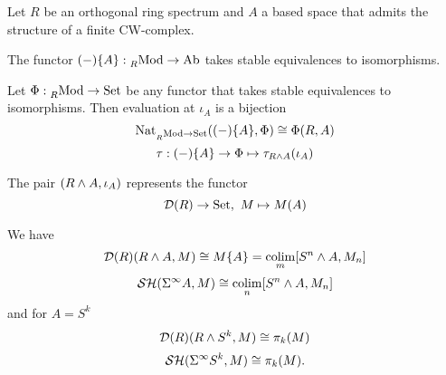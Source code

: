 \begin{theorem}
Let $R$ be an orthogonal ring spectrum and $A$ a based space that admits the structure of a finite CW-complex.
\begin{rmnumerate}
    \item The functor $(-)\{A\}:\prescript{}{R}{\operatorname{Mod}}\to{\normalfont\textup{Ab}}$ takes stable equivalences to isomorphisms.
    \item Let $\Phi:\prescript{}{R}{\operatorname{Mod}}\to{\normalfont\textup{Set}}$ be any functor that takes stable equivalences to isomorphisms. Then evaluation at $\iota_A$ is a bijection
    \[\operatorname{Nat}_{\prescript{}{R}{\operatorname{Mod}}\to{\normalfont\textup{Set}}}((-)\{A\},\Phi)\cong\Phi(R,A)\]
    \[\tau:(-)\{A\}\to\Phi\mapsto\tau_{R\wedge A}(\iota_A)\]
    \item The pair $(R\wedge A,\iota_A)$ represents the functor
    \[\Dd(R)\to\Set,\ M\mapsto M(A)\]
\end{rmnumerate}
\end{theorem}

\begin{examples}
We have
\[\mathcal{D}(R)(R\wedge A,M)\cong M\{A\}=\operatorname*{colim}_m[S^n\wedge A,M_n]\]
\[\mathcal{S}\mathcal{H}(\Sigma^\infty A,M)\cong\operatorname*{colim}_n[S^n\wedge A,M_n]\]
and for $A=S^k$
\[\mathcal{D}(R)(R\wedge S^k,M)\cong\pi_k(M)\]
\[\mathcal{S}\mathcal{H}(\Sigma^\infty S^k,M)\cong\pi_k(M).\]
\end{examples}

